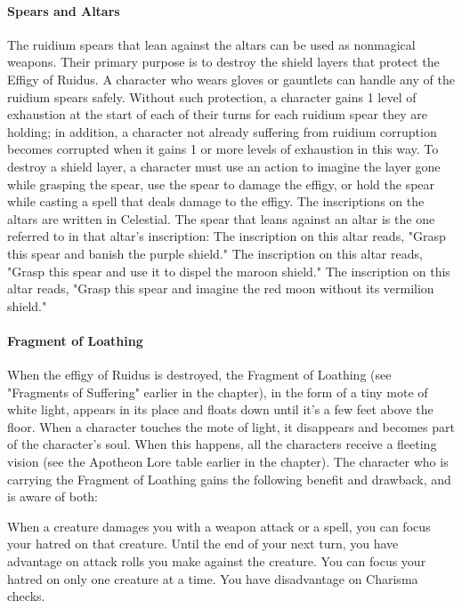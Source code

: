 \documentclass[10pt,a4,twoside,twocolumn,openany,nodeprecatedcode]{dndbook}
\begin{document}
\paragraph{Spears and Altars}
The ruidium spears that lean against the altars can be used as nonmagical weapons. Their primary purpose is to destroy the shield layers that protect the Effigy of Ruidus.
A character who wears gloves or gauntlets can handle any of the ruidium spears safely. Without such protection, a character gains 1 level of exhaustion at the start of each of their turns for each ruidium spear they are holding; in addition, a character not already suffering from ruidium corruption becomes corrupted when it gains 1 or more levels of exhaustion in this way.
To destroy a shield layer, a character must use an action to imagine the layer gone while grasping the spear, use the spear to damage the effigy, or hold the spear while casting a spell that deals damage to the effigy. The inscriptions on the altars are written in Celestial. The spear that leans against an altar is the one referred to in that altar's inscription:
{{The inscription on this altar reads, "Grasp this spear and banish the purple shield."}}
{{The inscription on this altar reads, "Grasp this spear and use it to dispel the maroon shield."}}
{{The inscription on this altar reads, "Grasp this spear and imagine the red moon without its vermilion shield."}}
\paragraph{Fragment of Loathing}
When the effigy of Ruidus is destroyed, the Fragment of Loathing (see "Fragments of Suffering" earlier in the chapter), in the form of a tiny mote of white light, appears in its place and floats down until it's a few feet above the floor. When a character touches the mote of light, it disappears and becomes part of the character's soul. When this happens, all the characters receive a fleeting vision (see the Apotheon Lore table earlier in the chapter).
The character who is carrying the Fragment of Loathing gains the following benefit and drawback, and is aware of both:
\begin{DndComment}{}
{{When a creature damages you with a weapon attack or a spell, you can focus your hatred on that creature. Until the end of your next turn, you have advantage on attack rolls you make against the creature. You can focus your hatred on only one creature at a time.}}
{{You have disadvantage on Charisma checks.}}
\end{DndComment}
\end{document}
